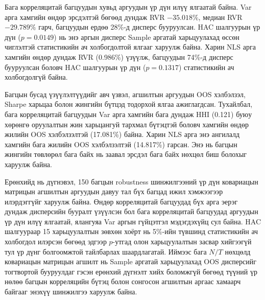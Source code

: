 Бага корреляцитай багцуудын хувьд аргуудын үр дүн илүү
ялгаатай байна. Var арга хамгийн өндөр эрсдэлтэй бөгөөд
дундаж RVR $-35.018\%$, медиан RVR $-29.789\%$ гарч,
багцуудын ердөө 28\%-д дисперс бууруулсан.
HAC шалгуурын үр дүн ($p=0.0149$) нь энэ аргын дисперс
Sample аргатай харьцуулахад өссөн чиглэлтэй статистикийн
ач холбогдолтой ялгааг харуулж байна.
Харин NLS арга хамгийн өндөр дундаж RVR (0.986\%)
үзүүлж, багцуудын 74\%-д дисперс бууруулсан боловч
HAC шалгуурын үр дүн ($p=0.1317$) статистикийн
ач холбогдолгүй байна.

Багцын бусад үзүүлэлтүүдийг авч үзвэл, агшилтын аргуудын OOS хэлбэлзэл, Sharpe харьцаа болон жингийн бүтцэд тодорхой ялгаа ажиглагдсан. Тухайлбал, бага корреляцитай багцуудын Var арга хамгийн бага дундаж HHI (0.121) буюу хөрөнгө оруулалтын жин харьцангуй тархмал бүтэцтэй боловч хамгийн өндөр жилийн OOS хэлбэлзэлтэй (17.081\%) байна. Харин NLS арга энэ ангилалд хамгийн бага жилийн OOS хэлбэлзэлтэй (14.817\%) гарсан. Энэ нь багцын жингийн төвлөрөл бага байх нь заавал эрсдэл бага байх нөхцөл биш болохыг харуулж байна.

Ерөнхийд нь дүгнэвэл, 150 багцын robustness шинжилгээний үр дүн ковариацын матрицын агшилтын аргуудын давуу тал бүх багцад ижил хэмжээгээр илэрдэггүйг харуулж байна. Өндөр корреляцитай багцуудад бүх арга эерэг дундаж дисперсийн бууралт үзүүлсэн бол бага корреляцитай багцуудад аргуудын үр дүн илүү ялгаатай, ялангуяа Var аргын гүйцэтгэл мэдэгдэхүйц сул байна. HAC шалгуураар 15 харьцуулалтын зөвхөн хоёрт нь 5\%-ийн түвшинд статистикийн ач холбогдол илэрсэн бөгөөд эдгээр \(p\)-утгад олон харьцуулалтын засвар хийгээгүй тул үр дүнг болгоомжтой тайлбарлах шаардлагатай. Иймээс бага \(N/T\) нөхцөлд ковариацын матрицын агшилт нь Sample аргатай харьцуулахад OOS дисперсийг тогтвортой бууруулдаг гэсэн ерөнхий дүгнэлт хийх боломжгүй бөгөөд түүний үр нөлөө багцын корреляцийн бүтэц болон сонгосон агшилтын аргаас хамаарч байгааг энэхүү шинжилгээ харуулж байна.



